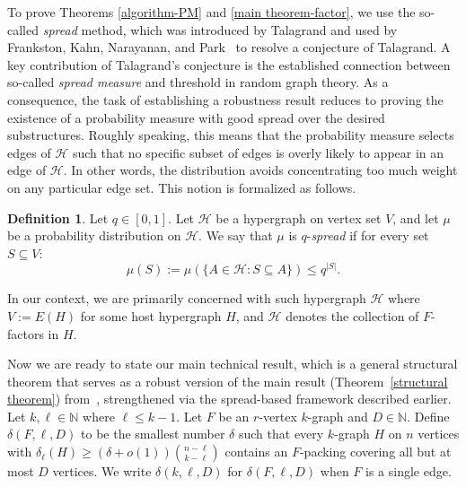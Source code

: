 \documentclass[11pt, letterpaper]{amsart}
\theoremstyle{plain}
\numberwithin{equation}{section}
\theoremstyle{definition}
\newtheorem{definition}[thm]{Definition}
\newcommand\card[1]{\left| #1 \right|}
\begin{document}
    To prove Theorems \ref{algorithm-PM} and \ref{main theorem-factor}, we use the so-called \textit{spread} method, which was introduced by Talagrand and used by Frankston, Kahn, Narayanan, and Park~\cite{frankston2021thresholds} to resolve a conjecture of Talagrand. 
    A key contribution of Talagrand's conjecture is the established connection between so-called \emph{spread measure} and threshold in random graph theory. 
    As a consequence, the task of establishing a robustness result reduces to proving the existence of a probability measure with good spread over the desired substructures. 
    Roughly speaking, this means that the probability measure selects edges of \(\mathcal{H}\) such that no specific subset of edges is overly likely to appear in an edge of \(\mathcal{H}\). 
    In other words, the distribution avoids concentrating too much weight on any particular edge set. This notion is formalized as follows.

    \begin{definition}
        Let \(q\in [0,1]\). Let \(\mathcal{H}\) be a hypergraph on vertex set $V$, and let \(\mu\) be a probability distribution on \(\mathcal{H}\). We say that \(\mu\) is \(q\)-\emph{spread} if for every set \(S\subseteq  V\):
        \[\mu(S):=\mu \left(\{A\in \mathcal{H}:S\subseteq A\}\right)\le q^{\card{S}}.\]
    \end{definition}
     In our context, we are primarily concerned with such hypergraph \(\mathcal{H}\) where \(V:=E(H)\) for some host hypergraph \(H\), and \(\mathcal{H}\) denotes the collection of \(F\)-factors in \(H\).


    Now we are ready to state our main technical result, which is a general structural theorem that serves as a robust version of the main result (Theorem~\ref{structural theorem}) from~\cite{han2020complexity}, strengthened via the spread-based framework described earlier. 
    Let \(k, \ell \in \mathbb{N}\) where \(\ell \le k-1\). Let \(F\) be an \(r\)-vertex \(k\)-graph and \(D \in \mathbb{N}\). Define \(\delta(F,\ell,D)\) to be the smallest number \(\delta\) such that every \(k\)-graph \(H\) on \(n\) vertices with \(\delta_{\ell}(H) \ge (\delta + o(1))\binom{n - \ell}{k - \ell}\) contains an \(F\)-packing covering all but at most \(D\) vertices. 
    We write \(\delta(k,\ell,D)\) for \(\delta(F,\ell,D)\) when \(F\) is a single edge. 
\end{document}
